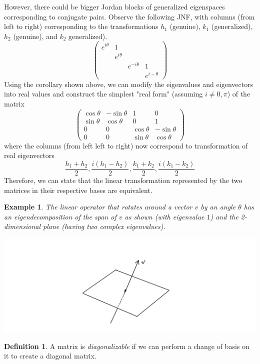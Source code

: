 \documentclass{article}
\newtheorem{example}{Example}[section]
\theoremstyle{remark}
\theoremstyle{definition}
\newtheorem{definition}{Definition}[section]
\begin{document}
However, there could be bigger Jordan blocks of generalized eigenspaces corresponding to conjugate pairs. Observe the following JNF, with columns (from left to right) corresponding to the transformations $h_1$ (genuine), $k_1$ (generalized), $h_2$ (genuine), and $k_2$ generalized). 
\[\begin{pmatrix}
e^{i \theta} & 1 & & \\
& e^{i \theta} & & \\
& & e^{-i \theta} & 1 \\
& & & e^{i- \theta}
\end{pmatrix}\]
Using the corollary shown above, we can modify the eigenvalues and eigenvectors into real values and construct the simplest "real form" (assuming $i \neq 0, \pi$) of the matrix 
\[\begin{pmatrix}
\cos{\theta} & - \sin{\theta} & 1 & 0 \\
\sin{\theta} & \cos{\theta} & 0 & 1 \\
0 & 0 & \cos{\theta} & - \sin{\theta} \\
0 & 0 & \sin{\theta} & \cos{\theta}
\end{pmatrix}\]
where the columns (from left left to right) now correspond to transformation of real eigenvectors
\[\frac{h_1 + h_2}{2}, \frac{i(h_1 - h_2)}{2}, \frac{k_1 + k_2}{2}, \frac{i(k_1 - k_2)}{2}\]
Therefore, we can state that the linear transformation represented by the two matrices in their respective bases are equivalent. 

\begin{example}
The linear operator that rotates around a vector $v$ by an angle $\theta$ has an eigendecomposition of the span of $v$ as shown (with eigenvalue $1$) and the 2-dimensional plane (having two complex eigenvalues). 
\begin{center}
    \includegraphics[scale=0.25]{Images/Rotation_Map_Eigendecomposition.PNG}
\end{center}
\end{example}

\begin{definition}
A matrix is \textit{diagonalizable} if we can perform a change of basis on it to create a diagonal matrix. 
\end{definition}
\end{document}
